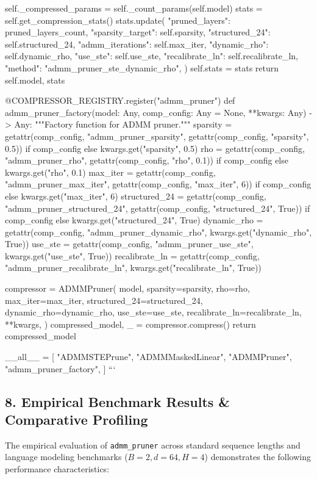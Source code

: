         self.\_compressed\_params = self.\_count\_params(self.model)
        stats = self.get\_compression\_stats()
        stats.update({
            "pruned\_layers": pruned\_layers\_count,
            "sparsity\_target": self.sparsity,
            "structured\_24": self.structured\_24,
            "admm\_iterations": self.max\_iter,
            "dynamic\_rho": self.dynamic\_rho,
            "use\_ste": self.use\_ste,
            "recalibrate\_ln": self.recalibrate\_ln,
            "method": "admm\_pruner\_ste\_dynamic\_rho",
        })
        self.stats = stats
        return self.model, stats


@COMPRESSOR\_REGISTRY.register("admm\_pruner")
def admm\_pruner\_factory(model: Any, comp\_config: Any = None, **kwargs: Any) -> Any:
    """Factory function for ADMM pruner."""
    sparsity = getattr(comp\_config, "admm\_pruner\_sparsity", getattr(comp\_config, "sparsity", 0.5)) if comp\_config else kwargs.get("sparsity", 0.5)
    rho = getattr(comp\_config, "admm\_pruner\_rho", getattr(comp\_config, "rho", 0.1)) if comp\_config else kwargs.get("rho", 0.1)
    max\_iter = getattr(comp\_config, "admm\_pruner\_max\_iter", getattr(comp\_config, "max\_iter", 6)) if comp\_config else kwargs.get("max\_iter", 6)
    structured\_24 = getattr(comp\_config, "admm\_pruner\_structured\_24", getattr(comp\_config, "structured\_24", True)) if comp\_config else kwargs.get("structured\_24", True)
    dynamic\_rho = getattr(comp\_config, "admm\_pruner\_dynamic\_rho", kwargs.get("dynamic\_rho", True))
    use\_ste = getattr(comp\_config, "admm\_pruner\_use\_ste", kwargs.get("use\_ste", True))
    recalibrate\_ln = getattr(comp\_config, "admm\_pruner\_recalibrate\_ln", kwargs.get("recalibrate\_ln", True))

    compressor = ADMMPruner(
        model,
        sparsity=sparsity,
        rho=rho,
        max\_iter=max\_iter,
        structured\_24=structured\_24,
        dynamic\_rho=dynamic\_rho,
        use\_ste=use\_ste,
        recalibrate\_ln=recalibrate\_ln,
        **kwargs,
    )
    compressed\_model, \_ = compressor.compress()
    return compressed\_model

\_\_all\_\_ = [
    "ADMMSTEPrune",
    "ADMMMaskedLinear",
    "ADMMPruner",
    "admm\_pruner\_factory",
]
```



\subsection{8. Empirical Benchmark Results \& Comparative Profiling}
The empirical evaluation of \texttt{admm_pruner} across standard sequence lengths and language modeling benchmarks ($B=2, d=64, H=4$) demonstrates the following performance characteristics:


